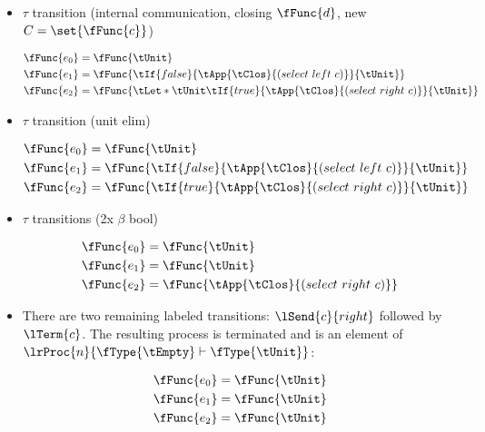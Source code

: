 \begin{itemize}
\item $\tau$ transition (internal communication, closing $\fFunc{d}$,
  new $C = \set{\fFunc{c}}$)
  \begin{small}
    \begin{align*}
      \fFunc{e_0} &=
                    \fFunc{\tUnit}
      \\
      \fFunc{e_1} &=
                    \fFunc{{{\tIf{false}{\tApp{\tClos}{(select~left~c)}}{\tUnit}}}}
      \\
      \fFunc{e_2} &=
                    \fFunc{{{\tLet*{\tUnit}{\tIf{true}{\tApp{\tClos}{(select~right~c)}}{\tUnit}}}}}
    \end{align*}
  \end{small}
\item $\tau$ transition (unit elim)
  \begin{small}
    \begin{align*}
      \fFunc{e_0} &=
                    \fFunc{\tUnit}
      \\
      \fFunc{e_1} &=
                    \fFunc{{{\tIf{false}{\tApp{\tClos}{(select~left~c)}}{\tUnit}}}}
      \\
      \fFunc{e_2} &=
                    \fFunc{{{{\tIf{true}{\tApp{\tClos}{(select~right~c)}}{\tUnit}}}}}
    \end{align*}
  \end{small}
\item $\tau$ transitions (2x $\beta$ bool)
  \begin{small}
    \begin{align*}
      \fFunc{e_0} &=
                    \fFunc{\tUnit}
      \\
      \fFunc{e_1} &=
                    \fFunc{{{{\tUnit}}}}
      \\
      \fFunc{e_2} &=
                    \fFunc{{{{{\tApp{\tClos}{(select~right~c)}}}}}}
    \end{align*}
  \end{small}
\item There are two remaining labeled transitions: $\lSend{c}{right}$
  followed by $\lTerm{c}$. The resulting process is terminated and is
  an element of $\lrProc{n}{\fType{\tEmpty} \vdash \fType{\tUnit}}$:
  \begin{small}
    \begin{align*}
      \fFunc{e_0} &=
                    \fFunc{\tUnit}
      \\
      \fFunc{e_1} &=
                    \fFunc{{{{\tUnit}}}}
      \\
      \fFunc{e_2} &=
                    \fFunc{{{{{\tUnit}}}}}
    \end{align*}
  \end{small}
\end{itemize}

